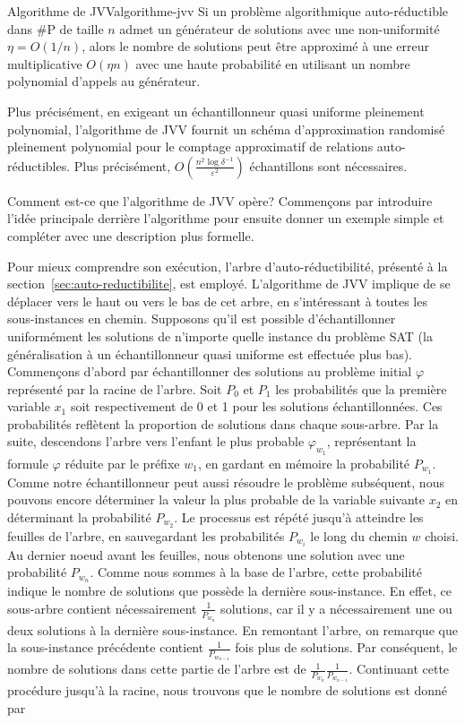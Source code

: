 \begin{maintheorem}{Algorithme de JVV}{algorithme-jvv}
    Si un problème algorithmique auto-réductible dans \textsf{\#P} de taille $n$ admet un générateur de solutions avec une non-uniformité $\eta = O(1 / n)$, alors le nombre de solutions peut être approximé à une erreur multiplicative $O(\eta n)$ avec une haute probabilité en utilisant un nombre polynomial d'appels au générateur.
\end{maintheorem}

Plus précisément, en exigeant un échantillonneur quasi uniforme pleinement polynomial, l'algorithme de JVV fournit un schéma d'approximation randomisé pleinement polynomial pour le comptage approximatif de relations auto-réductibles. Plus précisément, $O(\frac{n^{2} \log \delta^{-1}}{\varepsilon^{2}})$ échantillons sont nécessaires.


Comment est-ce que l'algorithme de JVV opère? Commençons par introduire l'idée principale derrière l'algorithme pour ensuite donner un exemple simple et compléter avec une description plus formelle. 

Pour mieux comprendre son exécution, l'arbre d'auto-réductibilité, présenté à la section~\ref{sec:auto-reductibilite}, est employé. L'algorithme de JVV implique de se déplacer vers le haut ou vers le bas de cet arbre, en s'intéressant à toutes les sous-instances en chemin. Supposons qu'il est possible d'échantillonner uniformément les solutions de n'importe quelle instance du problème SAT (la généralisation à un échantillonneur quasi uniforme est effectuée plus bas). Commençons d'abord par échantillonner des solutions au problème initial $\varphi$ représenté par la racine de l'arbre. Soit $P_{0}$ et $P_{1}$ les probabilités que la première variable $x_{1}$ soit respectivement de 0 et 1 pour les solutions échantillonnées. Ces probabilités reflètent la proportion de solutions dans chaque sous-arbre. Par la suite, descendons l'arbre vers l'enfant le plus probable $\varphi_{w_{1}}$, représentant la formule $\varphi$ réduite par le préfixe $w_{1}$, en gardant en mémoire la probabilité $P_{w_{1}}$. Comme notre échantillonneur peut aussi résoudre le problème subséquent, nous pouvons encore déterminer la valeur la plus probable de la variable suivante $x_{2}$ en déterminant la probabilité $P_{w_{2}}$. Le processus est répété jusqu'à atteindre les feuilles de l'arbre, en sauvegardant les probabilités $P_{w_{i}}$ le long du chemin $w$ choisi. Au dernier noeud avant les feuilles, nous obtenons une solution avec une probabilité $P_{w_{n}}$. Comme nous sommes à la base de l'arbre, cette probabilité indique le nombre de solutions que possède la dernière sous-instance. En effet, ce sous-arbre contient nécessairement $\frac{1}{P_{w_{n}}}$ solutions, car il y a nécessairement une ou deux solutions à la dernière sous-instance. En remontant l'arbre, on remarque que la sous-instance précédente contient $\frac{1}{P_{w_{n-1}}}$ fois plus de solutions. Par conséquent, le nombre de solutions dans cette partie de l'arbre est de $\frac{1}{P_{w_{n}}} \frac{1}{P_{w_{n-1}}}$. Continuant cette procédure jusqu'à la racine, nous trouvons que le nombre de solutions est donné par 

